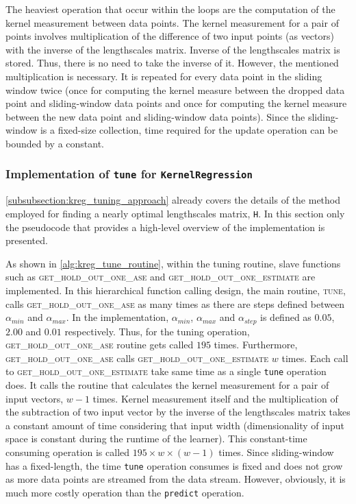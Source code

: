 The heaviest operation that occur within the loops are the computation of the kernel measurement between data points. The kernel measurement for a pair of points involves multiplication of the difference of two input points (as vectors) with the inverse of the lengthscales matrix. Inverse of the lengthscales matrix is stored. Thus, there is no need to take the inverse of it. However, the mentioned multiplication is necessary. It is repeated for every data point in the sliding window twice (once for computing the kernel measure between the dropped data point and sliding-window data points and once for computing the kernel measure between the new data point and sliding-window data points). Since the sliding-window is a fixed-size collection, time required for the update operation can be bounded by a constant.

\subsubsection{Implementation of \texttt{tune} for \texttt{KernelRegression}}
\label{subsubsection:impl_tune_kreg}

\ref{subsubsection:kreg_tuning_approach} already covers the details of the method employed for finding a nearly optimal lengthscales matrix, \texttt{H}. In this section only the pseudocode that provides a high-level overview of the implementation is presented.

As shown in \ref{alg:kreg_tune_routine}, within the tuning routine, slave functions such as \textsc{get\_hold\_out\_one\_ase} and \textsc{get\_hold\_out\_one\_estimate} are implemented. In this hierarchical function calling design, the main routine, \textsc{tune}, calls \textsc{get\_hold\_out\_one\_ase} as many times as there are steps defined between $\alpha_{min}$ and $\alpha_{max}$. In the implementation, $\alpha_{min}$, $\alpha_{max}$ and $\alpha_{step}$ is defined as $0.05$, $2.00$ and $0.01$ respectively. Thus, for the tuning operation, \textsc{get\_hold\_out\_one\_ase} routine gets called $195$ times. Furthermore, \textsc{get\_hold\_out\_one\_ase} calls \textsc{get\_hold\_out\_one\_estimate} $w$ times. Each call to \textsc{get\_hold\_out\_one\_estimate} take same time as a single \texttt{tune} operation does. It calls the routine that calculates the kernel measurement for a pair of input vectors, $w-1$ times. Kernel measurement itself and the multiplication of the subtraction of two input vector by the inverse of the lengthscales matrix takes a constant amount of time considering that input width (dimensionality of input space is constant during the runtime of the learner). This constant-time consuming operation is called $195\times w \times (w-1)$ times. Since sliding-window has a fixed-length, the time \texttt{tune} operation consumes is fixed and does not grow as more data points are streamed from the data stream. However, obviously, it is much more costly operation than the \texttt{predict} operation.

